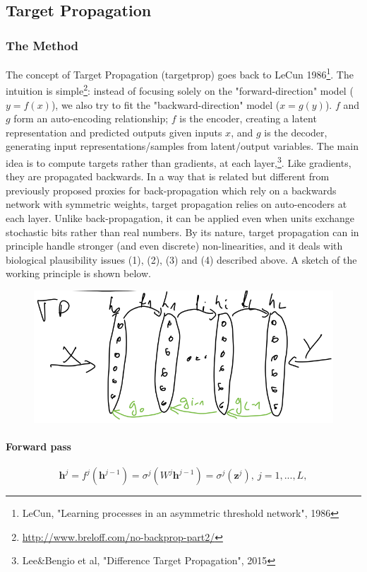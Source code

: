 \documentclass[main]{subfiles}
\begin{document}
\subsection{Target Propagation}

\subsubsection{The Method}
The concept of Target Propagation (targetprop) goes back to LeCun 1986\footnote{LeCun, "Learning processes in an asymmetric threshold network", 1986}. The intuition is simple\footnote{\url{http://www.breloff.com/no-backprop-part2/}}: instead of focusing solely on the "forward-direction" model ($y=f(x)$), we also try to fit the "backward-direction" model ($x=g(y)$). $f$ and $g$ form an auto-encoding relationship; $f$ is the encoder, creating a latent representation and predicted outputs given inputs $x$, and $g$ is the decoder, generating input representations/samples from latent/output variables.
The main idea is to compute targets rather than gradients, at each layer,\footnote{Lee\&Bengio et al, "Difference Target Propagation", 2015}. Like gradients, they are propagated backwards. In a way that is related but different from previously proposed proxies for back-propagation which rely on a backwards network with symmetric weights, target propagation relies on auto-encoders at each layer. Unlike back-propagation, it can be applied even when units exchange stochastic bits rather than real numbers. By its nature, target propagation can in principle handle stronger (and even discrete) non-linearities, and it deals with biological plausibility issues (1), (2), (3) and (4) described above. A sketch of the working principle is shown below. 

\begin{figure}[H]
	\centering
	\includegraphics[width=0.7\linewidth]{02_TrainingMethodsForDeepANNs/figures/target_propagation.png}
	\caption{}
	\label{fig:targetprop}
\end{figure}

\paragraph{Forward pass}
\begin{equation}
	\bm{h}^j = f^j(\bm{h}^{j-1}) = \sigma^j(W^j\bm{h}^{j-1}) = \sigma^j(\bm{z}^j),\ j=1, ..., L ,
\end{equation}
\end{document}
